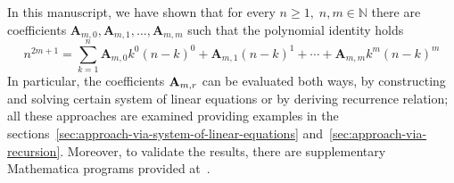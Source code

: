 In this manuscript, we have shown that for every $n\geq 1, \; n,m\in\mathbb{N}$
there are coefficients $\mathbf{A}_{m,0}, \mathbf{A}_{m,1}, \ldots, \mathbf{A}_{m,m}$ such that
the polynomial identity holds
\[
    n^{2m+1} = \sum_{k=1}^{n} \mathbf{A}_{m,0} k^0 (n-k)^0 + \mathbf{A}_{m,1}(n-k)^1
    + \cdots + \mathbf{A}_{m,m} k^m (n-k)^m
\]
In particular, the coefficients ${\mathbf{A}} \sb{m,r}$ can be evaluated both ways,
by constructing and solving certain system of linear equations or by deriving recurrence relation;
all these approaches are examined providing examples
in the sections~\ref{sec:approach-via-system-of-linear-equations} and~\ref{sec:approach-via-recursion}.
Moreover, to validate the results,
there are supplementary Mathematica programs provided at~\cite{kolosov2023github}.
